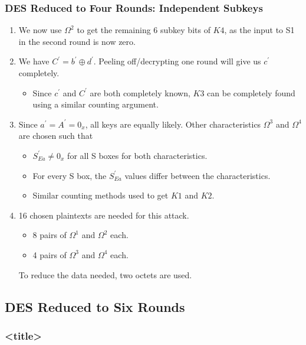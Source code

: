 \documentclass{beamer}
\begin{document}
	\begin{frame}
		\frametitle{DES Reduced to Four Rounds: Independent Subkeys}
		\begin{enumerate}
			\item<1-> We now use \(\Omega^2\) to get the remaining 6 subkey bits
			of \(K4\), as the input to S1 in the second round is now zero.
			\item<2-> We have \(C^\prime = b^\prime \oplus d^\prime\). Peeling
			off/decrypting one round will give us \(c^\prime\) completely.
			\begin{itemize}
				\item<3-> Since \(c^\prime\) and \(C^\prime\) are both
				completely known, \(K3\) can be completely found using a similar
				counting argument.
			\end{itemize}
			\item<4-> Since \(a^\prime = A^\prime = 0_x\), all keys are equally
			likely. Other characteristics \(\Omega^3\) and \(\Omega^4\) are
			chosen such that
			\begin{itemize}
				\item \(S_{Ea}^\prime \neq 0_x\) for all S boxes for both
				characteristics.
				\item For every S box, the \(S_{Ea}^\prime\) values differ
				between the characteristics.
				\item Similar counting methods used to get \(K1\) and \(K2\).
			\end{itemize}
			\item<5-> 16 chosen plaintexts are needed for this attack.
			\begin{itemize}
				\item 8 pairs of \(\Omega^1\) and \(\Omega^2\) each.
				\item 4 pairs of \(\Omega^3\) and \(\Omega^4\) each.
			\end{itemize}
			To reduce the data needed, two octets are used.
		\end{enumerate}
	\end{frame}

	\subsection{DES Reduced to Six Rounds}

	\begin{frame}
		\frametitle{<title>}
	
		
	
	\end{frame}
\end{document}
